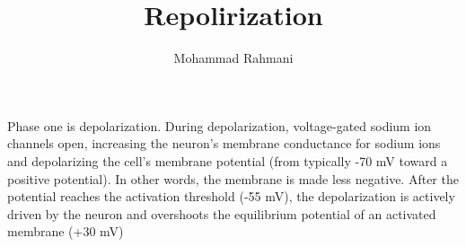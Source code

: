 \documentclass[a4paper]{article}
\title{Repolirization}
\date{}
\author{Mohammad Rahmani}
\begin{document}
    \maketitle
    Phase one is depolarization. During depolarization, voltage-gated sodium ion channels open, increasing the neuron's membrane conductance for sodium ions and depolarizing the cell's membrane potential (from typically -70 mV toward a positive potential). In other words, the membrane is made less negative. After the potential reaches the activation threshold (-55 mV), the depolarization is actively driven by the neuron and overshoots the equilibrium potential of an activated membrane (+30 mV) 
    
    
\end{document}
